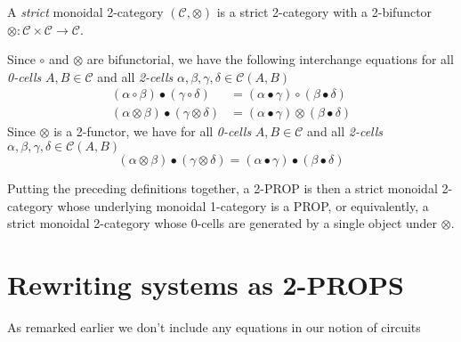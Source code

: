 \documentclass[a4paper]{article}
\begin{document}
\begin{definition}\label{def:monoidal-two-cat}
  A \emph{strict} monoidal 2-category $(\mathcal{C}, \otimes)$ is a
  strict 2-category with a 2-bifunctor $\otimes: \mathcal{C} \times
  \mathcal{C} \to \mathcal{C}$.
\end{definition}


\begin{remark}
  Since $\circ$ and $\otimes$ are bifunctorial, we have the following
    interchange equations for all \emph{0-cells} $A, B \in \mathcal{C}$ and all
    \emph{2-cells} $\alpha, \beta, \gamma, \delta \in \mathcal{C}(A, B)$
  \begin{align}
    (\alpha \circ \beta) \bullet (\gamma \circ \delta) &= (\alpha \bullet
      \gamma) \circ (\beta \bullet \delta) \\
    (\alpha \otimes \beta) \bullet (\gamma \otimes \delta) &= (\alpha \bullet
      \gamma) \otimes (\beta \bullet \delta)
  \end{align}
  Since $\otimes$ is a 2-functor, we have for all \emph{0-cells} $A, B \in
    \mathcal{C}$ and all \emph{2-cells} $\alpha, \beta, \gamma, \delta \in
    \mathcal{C}(A, B)$
  \[
    (\alpha \otimes \beta) \bullet (\gamma \otimes \delta) = (\alpha \bullet
      \gamma) \bullet (\beta \bullet \delta)
  \]
\end{remark}

Putting the preceding definitions together, a 2-PROP is then a strict
monoidal 2-category whose underlying monoidal 1-category is a PROP, or
equivalently, a strict monoidal 2-category whose 0-cells are generated
by a single object under $\otimes$.


\section{Rewriting systems as 2-PROPS}
\label{sec:rewriting}

As remarked earlier we don't include any equations in our notion of
circuits 
\end{document}

